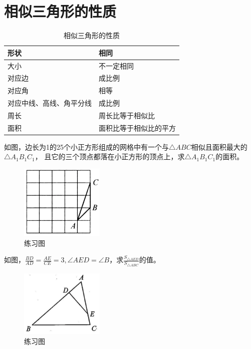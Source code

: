 \documentclass{ecnuthesis}
\begin{document}
\section{相似三角形的性质}
\begin{table}[H]
\centering
\caption{相似三角形的性质}
\begin{tabular}{l|p{8cm}}
\hline
\hline
形状 & 相同 \\
\hline
大小 & 不一定相同 \\
\hline
对应边 & 成比例 \\
\hline
对应角 & 相等 \\
\hline
对应中线、高线、角平分线 & 成比例 \\
\hline
周长 & 周长比等于相似比 \\
\hline
面积 & 面积比等于相似比的平方 \\
\hline
\hline
\end{tabular}
\end{table}
\begin{problem}
    如图，边长为1的25个小正方形组成的网格中有一个与$\triangle ABC$相似且面积最大的$\triangle A_1B_1C_1$，
    且它的三个顶点都落在小正方形的顶点上，求$\triangle A_1B_1C_1$的面积。
\end{problem}
\begin{figure}[H]
\centering
\includegraphics[width=4cm]{picture/827.png}
\caption{练习图}
\end{figure}
\begin{problem}
    如图，$\frac{BD}{AD}=\frac{AE}{CE}=3,\angle AED=\angle B$，求$\frac{S_{\triangle AED}}{S_{\triangle ABC}}$的值。\\
\end{problem}
\begin{figure}[H]
\centering
\includegraphics[width=4cm]{picture/833.png}
\caption{练习图}
\end{figure}
\end{document}
